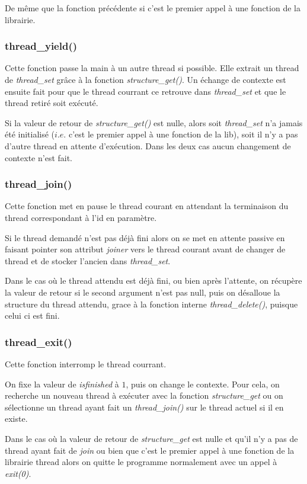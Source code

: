 De même que la fonction précédente si c'est le
premier appel à une fonction de la librairie.



\subsubsection{thread\_yield()}
Cette fonction passe la main à un autre thread si possible. Elle
extrait un thread de \textit{thread\_set} grâce à la fonction
\textit{structure\_get()}. Un échange de contexte est
ensuite fait pour que le thread courrant ce retrouve dans
\textit{thread\_set} et que le thread retiré soit exécuté.

Si la valeur de retour de \textit{structure\_get()} est nulle, alors
soit \textit{thread\_set} n'a jamais été initialisé ($i.e.$ c'est le
premier appel à une fonction de la lib), soit il n'y a pas d'autre
thread en attente d'exécution. Dans les deux cas aucun changement de
contexte n'est fait.

\subsubsection{thread\_join()}
Cette fonction met en pause le thread courant en attendant la
terminaison du thread correspondant à l'id en paramètre.

Si le thread demandé n'est pas déjà fini alors on se met en attente
passive en faisant pointer son attribut \textit{joiner} vers le thread
courant avant de changer de thread et de stocker l'ancien dans
\textit{thread\_set}.

Dans le cas où le thread attendu est déjà fini, ou bien après
l'attente, on récupère la valeur de retour si le second argument n'est
pas null, puis on désalloue la structure du thread attendu, grace à la
fonction interne \textit{thread\_delete()}, puisque celui ci est fini.


\subsubsection{thread\_exit()}
Cette fonction interromp le thread courrant.

On fixe la valeur de \textit{isfinished} à $1$, puis on change le
contexte. Pour cela, on recherche un nouveau thread à exécuter avec la
fonction \textit{structure\_get} ou on sélectionne un
thread ayant fait un \textit{thread\_join()} sur le thread actuel si
il en existe.

Dans le cas où la valeur de retour de \textit{structure\_get} est
nulle et qu'il n'y a pas de thread ayant fait de \textit{join} ou bien
que c'est le premier appel à une fonction de la librairie thread alors
on quitte le programme normalement avec un appel à \textit{exit(0)}.


